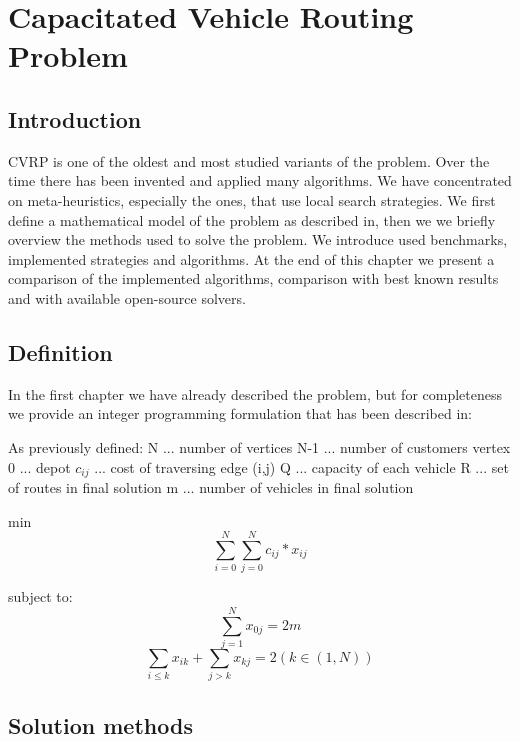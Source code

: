 \documentclass[thesis=B,english]{FITthesis}[2012/10/20]
\begin{document}
\chapter{Capacitated Vehicle Routing Problem}

    \section{Introduction}
    CVRP is one of the oldest and most studied variants of the problem. Over the time there has been invented and applied many algorithms. We have concentrated on meta-heuristics, especially the ones, that use local search strategies. We first define a mathematical model of the problem as described in\cite{7}, then we we briefly overview the methods used to solve the problem. We introduce used benchmarks, implemented strategies and algorithms. At the end of this chapter we present a comparison of the implemented algorithms, comparison with best known results and with available open-source solvers.
    \section{Definition}
    In the first chapter we have already described the problem, but for completeness we provide an integer programming formulation that has been described in\cite{7}:

    As previously defined:
    N        ... number of vertices
    N-1      ... number of customers
    vertex 0 ... depot
    \(c_{ij}\)   ... cost of traversing edge (i,j)
    Q        ... capacity of each vehicle
    R        ... set of routes in final solution
    m        ... number of vehicles in final solution

    min$$\sum_{i=0}^{N}\sum_{j=0}^{N} c_{ij} * x_{ij}$$

    subject to:
        $$\sum_{j=1}^{N} x_{0j} = 2m$$
        $$\sum_{i\le k} x_{ik} + \sum_{j>k} x_{kj} = 2 (k \in (1,N))$$



    \section{Solution methods}
\end{document}
